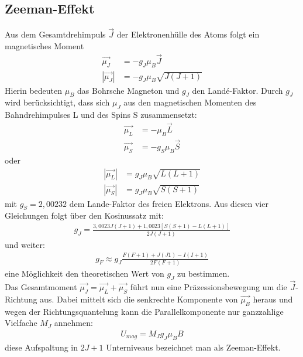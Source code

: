 \subsection{Zeeman-Effekt}
Aus dem Gesamtdrehimpuls $\vec{J}$ der Elektronenhülle des Atoms folgt ein magnetisches Moment
\begin{align*}
\vec{\mu_J}&=-g_J \mu_B \vec{J}\\
|\vec{\mu_J}|&=-g_J \mu_B \sqrt{J(J+1)}
\end{align*}
Hierin bedeuten $\mu_B$ das Bohrsche Magneton und $g_J$ den Landé-Faktor. Durch $g_J$ wird berücksichtigt, dass sich $\mu_J$ aus den magnetischen Momenten des Bahndrehimpulses L und des Spins S zusammensetzt:
\begin{align*}
\vec{\mu_L} &= -\mu_B \vec{L}\\
\vec{\mu_S} &= -g_S \mu_B \vec{S}
\end{align*}
oder
\begin{align*}
|\vec{\mu_L}|&=g_J \mu_B \sqrt{L(L+1)}\\
|\vec{\mu_S}|&=g_J \mu_B \sqrt{S(S+1)}
\end{align*}
mit $g_S = 2,00232$ dem Lande-Faktor des freien Elektrons.
Aus diesen vier Gleichungen folgt über den Kosinussatz mit:
\begin{align}
g_J = \frac{3,0023 J(J+1)+1,0023[S(S+1)-L(L+1)]}{2J(J+1)}
\label{eq_gj}
\end{align}
und weiter: 
\begin{align}
g_F \approx g_J \frac{F(F+1)+J(J1)-I(I+1)}{2F(F+1)}
\label{eq_gF}
\end{align}
eine Möglichkeit den theoretischen Wert von $g_J$ zu bestimmen.\\
 
Das Gesamtmoment $\vec{\mu_J} = \vec{\mu_L}+\vec{\mu_S}$ führt nun eine Präzessionsbewegung um die $\vec{J}$-Richtung aus. Dabei mittelt sich die senkrechte Komponente von $\vec{\mu_B}$ heraus und wegen der Richtungsquantelung kann die Parallelkomponente nur ganzzahlige Vielfache $M_J$ annehmen:
\begin{align}
U_{mag}= M_Jg_J \mu_B B
\end{align}
diese Aufspaltung in $2J+1$ Unterniveaus bezeichnet man als Zeeman-Effekt.

